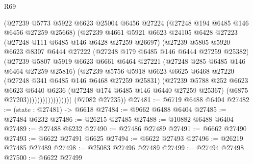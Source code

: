 \begin{lexlean}{R69}
\begin{coremodule}
{                          (@27239
                            @5773
                            @5922
                            @6623
                            @25004
                            @6456
                            @27224
                            (@27248 @194 @6485 @146 @6456 @27259 @25668)
                            (@27239
                              @4661
                              @5921
                              @6623
                              @24105
                              @6428
                              @27223
                              (@27248 @111 @6485 @146 @6428 @27259 @26697)
                              (@27239
                                @5805
                                @5920
                                @6623
                                @8307
                                @6444
                                @27222
                                (@27248 @179 @6485 @146 @6444 @27259 @25382)
                                (@27239
                                  @5807
                                  @5919
                                  @6623
                                  @6661
                                  @6464
                                  @27221
                                  (@27248 @285 @6485 @146 @6464 @27259 @25816)
                                  (@27239
                                    @5756
                                    @5918
                                    @6623
                                    @6625
                                    @6468
                                    @27220
                                    (@27248 @341 @6485 @146 @6468 @27259 @25831)
                                    (@27239
                                      @5788
                                      @252
                                      @6623
                                      @6623
                                      @6440
                                      @6236
                                      (@27248 @174 @6485 @146 @6440 @27259 @25367)
                                      (@6875 @27203)))))))))))))))))
      (@7082 @27235))
@27481 := @6719 @6488 @6404
@27482 := (state : @27481) -> @6618
@27484 := @9662 @6488 @6404
@27485 := @27484 @6232
@27486 := @26215 @27485
@27488 := @10882 @6488 @6404
@27489 := @27488 @6232
@27490 := @27486 @27489
@27491 := @6662 @27490
@27493 := @6622 @27491 @6625
@27494 := @6622 @27493
@27496 := @26219 @27485 @27489
@27498 := @25083 @27496 @27489
@27499 := @27494 @27498
@27500 := @6622 @27499
}
\end{coremodule}
\end{lexlean}

